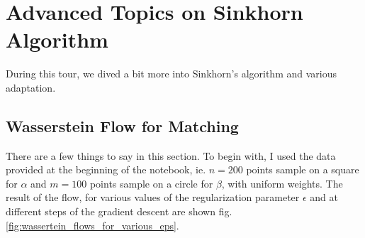 \section{Advanced Topics on Sinkhorn Algorithm}

During this tour, we dived a bit more into Sinkhorn's algorithm and various adaptation. 

\subsection{Wasserstein Flow for Matching}

There are a few things to say in this section. To begin with, I used the data provided at the beginning of the notebook, ie. $n=200$ points sample on a square for $\alpha$ and $m=100$ points sample on a circle for $\beta$, with uniform weights. The result of the flow, for various values of the regularization parameter $\epsilon$ and at different steps of the gradient descent are shown fig. \ref{fig:wassertein_flows_for_various_eps}. 

